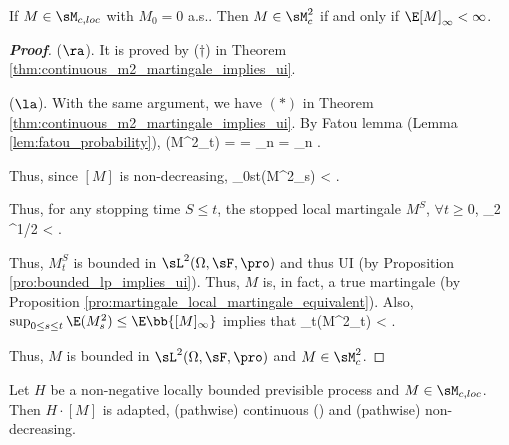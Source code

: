 
\begin{theorem}\label{thm:martingale_l2_iff_quadratic_variation_infinity_non_infinity}
If $M \in \sM_{c,loc}$ with $M_0 = 0$ a.s.. Then $M \in \sM^2_c$ if and only if $\E [M]_\infty < \infty$.
\end{theorem}

\begin{proof}[\bf Proof]
($\ra$). It is proved by ($\dag$) in Theorem \ref{thm:continuous_m2_martingale_implies_ui}.

($\la$). With the same argument, we have $(*)$ in Theorem \ref{thm:continuous_m2_martingale_implies_ui}. By Fatou lemma (Lemma \ref{lem:fatou_probability}),
\be
\E(M^2_t) = \E{} = \E{} \leq \liminf_{n}\E{} = \liminf_n \E{} \leq \E{}.
\ee

Thus, since $[M]$ is non-decreasing,
\be
\sup_{0\leq s\leq t}\E(M^2_s) \leq \E{} \leq \E\bb{[M]_\infty} < \infty.
\ee

Thus, for any stopping time $S\leq t$, the stopped local martingale $M^S$, $\forall t\geq 0$, %
\be
{}_2 \leq {}^{1/2} < \infty. %
\ee

Thus, $M^S_t$ is bounded in $\sL^2(\Omega,\sF,\pro)$ and thus UI (by Proposition \ref{pro:bounded_lp_implies_ui}). Thus, $M$ is, in fact, a true martingale (by Proposition \ref{pro:martingale_local_martingale_equivalent}). Also, $\sup_{0\leq s\leq t}\E(M^2_s)  \leq \E\bb{[M]_\infty}$ implies that
\be
\sup_{t}\E(M^2_t) \leq \E\bb{[M]_\infty} < \infty.
\ee

Thus, $M$ is bounded in $\sL^2(\Omega,\sF,\pro)$ and $M \in \sM_c^2$.
\end{proof}





\begin{corollary}\label{cor:locally_bounded_previsible_quadratic_variation_integral}
Let $H$ be a non-negative locally bounded previsible process and $M\in \sM_{c,loc}$. Then $H\cdot [M]$ is adapted, (pathwise) continuous (\cadlag) and (pathwise) non-decreasing.
\end{corollary}

